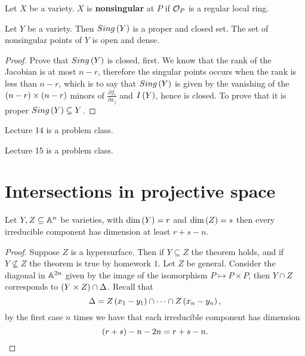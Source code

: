 \begin{definition}
Let $ X $ be a variety. $ X $ is \textbf{nonsingular} at $ P $ if $ \mathcal{O}_P $ is a regular local ring.
\end{definition}

\begin{theorem}
Let $ Y $ be a variety. Then $ Sing\left( Y \right) $ is a proper and closed set. The set of nonsingular points of $ Y $ is open and dense.
\end{theorem}

\begin{proof}
Prove that $ Sing\left( Y \right) $ is closed, first. We know that the rank of the Jacobian is at most $ n - r $, therefore the singular points occurs when the rank is less than $ n - r $, which is to say that $ Sing\left( Y \right) $ is given by the vanishing of the $ \left( n - r \right) \times \left( n - r \right) $ minors of $ \tfrac{\partial f_i}{\partial x_j} $ and $ I\left( Y \right) $, hence is closed. To prove that it is proper $ Sing\left( Y \right) \subsetneq Y $.
\end{proof}


Lecture 14 is a problem class.


Lecture 15 is a problem class.

\pagebreak

\section{Intersections in projective space}


\begin{theorem}
Let $ Y, Z \subseteq \mathbb{A}^n $ be varieties, with $ \dim\left( Y \right) = r $ and $ \dim\left( Z \right) = s $ then every irreducible component has dimension at least $ r + s - n $.
\end{theorem}

\begin{proof}
Suppose $ Z $ is a hypersurface. Then if $ Y \subseteq Z $ the theorem holds, and if $ Y \nsubseteq Z $ the theorem is true by homework $ 1 $. Let $ Z $ be general. Consider the diagonal in $ \mathbb{A}^{2n} $ given by the image of the isomorphism $ P \mapsto P \times P $, then $ Y \cap Z $ corresponds to $ \left( Y \times Z \right) \cap \Delta $. Recall that
$$ \Delta = Z\left( x_1 - y_1 \right) \cap \dots \cap Z\left( x_n - y_n \right), $$
by the first case $ n $ times we have that each irreducible component has dimension
$$ \left( r + s \right) - n - 2n = r + s - n. $$
\end{proof}

